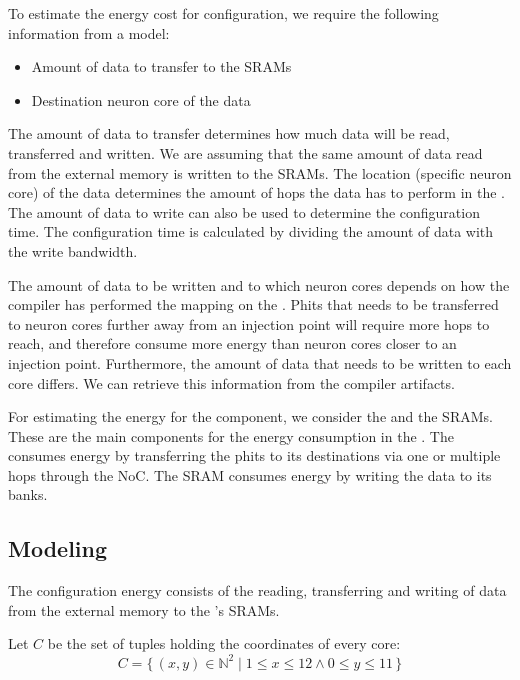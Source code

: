 To estimate the energy cost for configuration, we require the following information from a model:
\begin{itemize}
    \item Amount of data to transfer to the SRAMs
    \item Destination neuron core of the data
\end{itemize}

The amount of data to transfer determines how much data will be read, transferred and written.
We are assuming that the same amount of data read from the external memory is written to the SRAMs.
The location (specific neuron core) of the data determines the amount of hops the data has to perform in the \confignoc{}.
The amount of data to write can also be used to determine the configuration time.
The configuration time is calculated by dividing the amount of data with the write bandwidth.

The amount of data to be written and to which neuron cores depends on how the compiler has performed the mapping on the \graicore{}. %
Phits that needs to be transferred to neuron cores further away from an injection point will require more hops to reach, and therefore consume more energy than neuron cores closer to an injection point.
Furthermore, the amount of data that needs to be written to each core differs.
We can retrieve this information from the compiler artifacts.

For estimating the energy for the \graicore{} component, we consider the \confignoc{} and the SRAMs.
These are the main components for the energy consumption in the \graicore{}.
The \confignoc{} consumes energy by transferring the phits to its destinations via one or multiple hops through the NoC.
The SRAM consumes energy by writing the data to its banks.

\subsection{Modeling}
The configuration energy consists of the reading, transferring and writing of data from the external memory to the \graicore{}'s SRAMs. 

Let $C$ be the set of tuples holding the coordinates of every core:
\begin{equation*}
    C = \{\,\left(x,y\right) \in \mathbb{N}^2 \mid 1 \leq x \leq 12 \wedge 0 \leq y \leq 11 \,\} 
\end{equation*}

